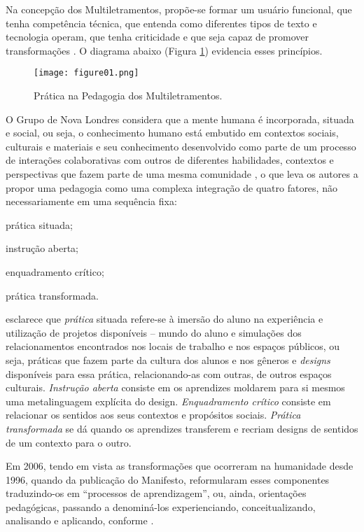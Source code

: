 \documentclass{textolivre}
\begin{document}
Na concepção dos Multiletramentos, propõe-se formar um usuário funcional, que
tenha competência técnica, que entenda como diferentes tipos de texto e
tecnologia operam, que tenha criticidade e que seja capaz de promover
transformações \cite{rojo2012}. O diagrama abaixo (Figura \ref{fig01}) evidencia esses princípios.

\begin{figure}[htbp]
 \centering
 \texttt{[image: figure01.png]}
 \caption{Prática na Pedagogia dos Multiletramentos.}
 \label{fig01}
\end{figure}

O Grupo de Nova Londres considera que a mente humana é incorporada, situada e
social, ou seja, o conhecimento humano está embutido em contextos sociais,
culturais e materiais e seu conhecimento desenvolvido como parte de um processo
de interações colaborativas com outros de diferentes habilidades, contextos e
perspectivas que fazem parte de uma mesma comunidade \cite{cope2009}, o
que leva os autores a propor uma pedagogia como uma complexa integração de
quatro fatores, não necessariamente em uma sequência fixa: 
\begin{enumerate*}[label=\alph*)]
\item prática situada;
\item instrução aberta;
\item enquadramento crítico;
\item prática transformada. 
\end{enumerate*}

\textcite{rojo2012} esclarece que \emph{prática} situada refere-se à imersão do aluno
na experiência e utilização de projetos disponíveis – mundo do aluno e
simulações dos relacionamentos encontrados nos locais de trabalho e nos espaços
públicos, ou seja, práticas que fazem parte da cultura dos alunos e nos gêneros
e \emph{designs} disponíveis para essa prática, relacionando-as com outras, de outros
espaços culturais. \emph{Instrução aberta} consiste em os aprendizes moldarem para si
mesmos uma metalinguagem explícita do design. \emph{Enquadramento crítico} consiste em
relacionar os sentidos aos seus contextos e propósitos sociais. \emph{Prática
transformada} se dá quando os aprendizes transferem e recriam designs de
sentidos de um contexto para o outro.

Em 2006, tendo em vista as transformações que ocorreram na humanidade desde
1996, quando da publicação do Manifesto, \textcite{cope2009} reformularam esses
componentes traduzindo-os em “processos de aprendizagem”, ou, ainda,
orientações pedagógicas, passando a denominá-los experienciando,
conceitualizando, analisando e aplicando, conforme .
\end{document}
